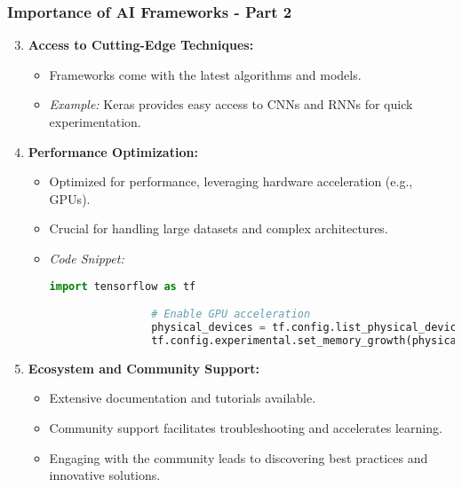 \documentclass{beamer}
\begin{document}
\begin{frame}[fragile]
    \frametitle{Importance of AI Frameworks - Part 2}
    \begin{enumerate}
        \setcounter{enumi}{2}
        \item \textbf{Access to Cutting-Edge Techniques:}
            \begin{itemize}
                \item Frameworks come with the latest algorithms and models.
                \item \textit{Example:} Keras provides easy access to CNNs and RNNs for quick experimentation.
            \end{itemize}

        \item \textbf{Performance Optimization:}
            \begin{itemize}
                \item Optimized for performance, leveraging hardware acceleration (e.g., GPUs).
                \item Crucial for handling large datasets and complex architectures.
                \item \textit{Code Snippet:}
                \begin{lstlisting}[language=Python]
                import tensorflow as tf

                # Enable GPU acceleration
                physical_devices = tf.config.list_physical_devices('GPU')
                tf.config.experimental.set_memory_growth(physical_devices[0], True)
                \end{lstlisting}
            \end{itemize}
        
        \item \textbf{Ecosystem and Community Support:}
            \begin{itemize}
                \item Extensive documentation and tutorials available.
                \item Community support facilitates troubleshooting and accelerates learning.
                \item Engaging with the community leads to discovering best practices and innovative solutions.
            \end{itemize}
    \end{enumerate}
\end{frame}
\end{document}
